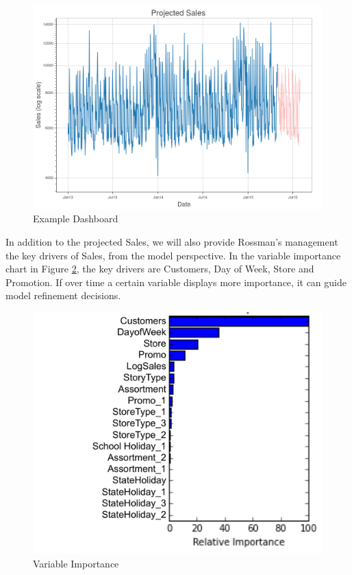 \documentclass[DIV=calc, paper=a4, fontsize=11pt]{scrartcl}	 %
\begin{document}
\begin{figure}[!htbp]
\centering
\caption{Example Dashboard}
\label{dash}
\includegraphics[width=\textwidth]{figures/dash.png}
\end{figure} 


In addition to the projected Sales, we will also provide Rossman’s management the key drivers of Sales, from the model perspective. In the variable importance chart in Figure \ref{variables}, the key drivers are Customers, Day of Week, Store and Promotion. If over time a certain variable displays more importance, it can guide model refinement decisions.



\begin{figure}[!htbp]
\centering
\caption{Variable Importance}
\label{variables}
\includegraphics[scale=0.35]{figures/variables.png}
\end{figure} 
\end{document}
